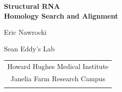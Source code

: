 \documentclass[landscape]{slides}
\begin{document}
\begin{slide}
\begin{center}
\large{\textbf{Structural RNA \\ Homology Search and Alignment}}

\normalsize

Eric Nawrocki

Sean Eddy's Lab


\medskip

\medskip

\small

\begin{tabular}{c}
Howard Hughes Medical Institute \\ 
Janelia Farm Research Campus \\
\\
\end{tabular}

\vspace{0.1in}

\end{center}
\end{slide}

\end{document}
